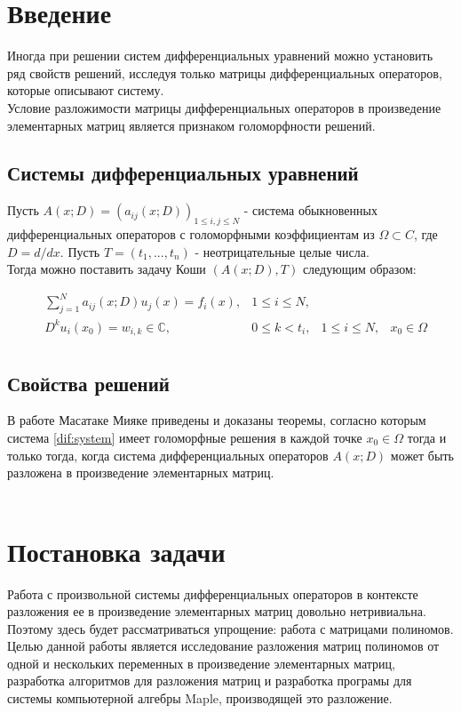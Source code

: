 \documentclass[14pt, a4paper]{extreport}
\begin{document}
\chapter{Введение}
	Иногда при решении систем дифференциальных уравнений можно установить ряд
	свойств решений, исследуя только матрицы дифференциальных операторов,
	которые описывают систему.
	\\
	Условие разложимости матрицы дифференциальных операторов в произведение
	элементарных матриц является \cite{miyake} признаком голоморфности решений.

	\section{Системы дифференциальных уравнений}
	Пусть $A(x;D) = (a_{ij}(x;D))_{1 \leq i, j \leq N}$ - система обыкновенных
	дифференциальных операторов с голоморфными коэффициентам из $\Omega \subset C$,
	где $D = d/dx$. Пусть $T = (t_1,...,t_n)$ - неотрицательные целые числа. \\
	Тогда можно поставить задачу Коши $(A(x;D), T)$ следующим образом:

	\begin{equation}
	\label{dif:system}
	\begin{aligned}
		& \sum\limits_{j=1}^N a_{ij}(x;D)u_j(x) = f_i(x), & 1 \leq i \leq N,\\
		& D^ku_i(x_0) = w_{i, k} \in \mathbb{C}, & 0 \leq k < t_i,  & 1 \leq i \leq N, & x_0 \in \Omega\\
	\end{aligned}
	\end{equation}

	\section{Свойства решений}
	В работе \cite{miyake} Масатаке Мияке приведены и доказаны теоремы, согласно которым система \ref{dif:system}
	имеет голоморфные решения в каждой точке $x_0 \in \Omega$ тогда и только тогда,
	когда система дифференциальных операторов $A(x;D)$ может быть разложена
	в произведение элементарных матриц. \\\\

\chapter{Постановка задачи}
	Работа с произвольной системы дифференциальных операторов в контексте разложения ее
	в произведение элементарных матриц довольно нетривиальна. Поэтому здесь будет
	рассматриваться упрощение: работа с матрицами полиномов.\\
	Целью данной работы является исследование разложения матриц полиномов от одной и нескольких
	переменных в произведение элементарных матриц, разработка алгоритмов для разложения матриц и
	разработка програмы для системы компьютерной алгебры Maple, производящей это разложение.
\end{document}
